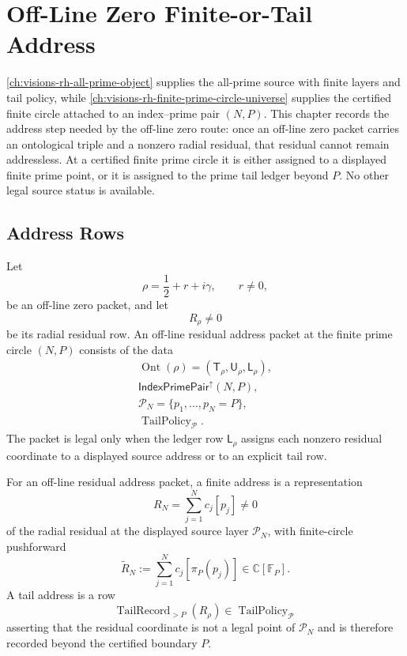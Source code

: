 \chapter{Off-Line Zero Finite-or-Tail Address}
\label{ch:visions-rh-offline-zero-finite-or-tail-address}

\autoref{ch:visions-rh-all-prime-object} supplies the all-prime source
with finite layers and tail policy, while
\autoref{ch:visions-rh-finite-prime-circle-universe} supplies the
certified finite circle attached to an index--prime pair $(N,P)$.  This
chapter records the address step needed by the off-line zero route:
once an off-line zero packet carries an ontological triple and a
nonzero radial residual, that residual cannot remain addressless.  At a
certified finite prime circle it is either assigned to a displayed
finite prime point, or it is assigned to the prime tail ledger beyond
$P$.  No other legal source status is available.

\section{Address Rows}
\label{sec:rh-offline-zero-finite-or-tail-address-rows}

\begin{definition}
\label{def:rh-offline-residual-address-packet}
Let
$$
\rho=\frac12+r+i\gamma,
\qquad
r\ne0,
$$
be an off-line zero packet, and let
$$
R_\rho\ne0
$$
be its radial residual row.  An off-line residual address packet at the
finite prime circle $(N,P)$ consists of the data
$$
\begin{gathered}
\operatorname{Ont}(\rho)
=
(\mathsf T_\rho,\mathsf U_\rho,\mathsf L_\rho),\\
\mathsf{IndexPrimePair}^{\uparrow}(N,P),\\
\mathcal P_N=\{p_1,\ldots,p_N=P\},\\
\operatorname{TailPolicy}_{\mathcal P}.
\end{gathered}
$$
The packet is legal only when the ledger row $\mathsf L_\rho$ assigns
each nonzero residual coordinate to a displayed source address or to an
explicit tail row.
\end{definition}

\begin{definition}
\label{def:rh-offline-zero-finite-tail-address}
For an off-line residual address packet, a finite address is a
representation
$$
R_N=\sum_{j=1}^{N}c_j[p_j]\ne0
$$
of the radial residual at the displayed source layer $\mathcal P_N$,
with finite-circle pushforward
$$
\widetilde R_N
:=
\sum_{j=1}^{N}c_j[\pi_P(p_j)]
\in\mathbb C[\mathbb F_P].
$$
A tail address is a row
$$
\operatorname{TailRecord}_{>P}(R_\rho)
\in
\operatorname{TailPolicy}_{\mathcal P}
$$
asserting that the residual coordinate is not a legal point of
$\mathcal P_N$ and is therefore recorded beyond the certified boundary
$P$.
\end{definition}

